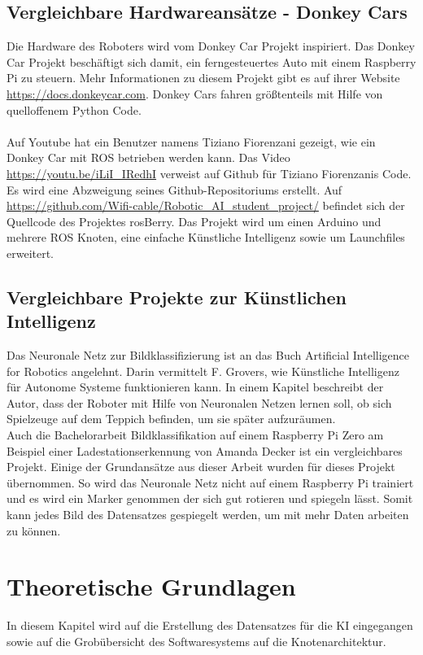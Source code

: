\documentclass[conference]{IEEEtran}
\begin{document}
	\subsection{Vergleichbare Hardwareansätze - Donkey Cars} %
	Die Hardware des Roboters wird vom Donkey Car Projekt inspiriert.
	Das Donkey Car Projekt beschäftigt sich damit, ein ferngesteuertes Auto mit einem Raspberry Pi zu steuern.
	Mehr Informationen zu diesem Projekt gibt es auf ihrer Website 
	\url{https://docs.donkeycar.com}.
	Donkey Cars fahren größtenteils mit Hilfe von quelloffenem Python Code. \\
	\\
	Auf Youtube hat ein Benutzer namens Tiziano Fiorenzani gezeigt, wie ein Donkey Car mit ROS betrieben werden kann.
	Das Video \url{https://youtu.be/iLiI\_IRedhI} verweist auf Github für 
	Tiziano 
	Fiorenzanis Code. Es wird eine Abzweigung seines Github-Repositoriums 
	erstellt. Auf 
	\url{https://github.com/Wifi-cable/Robotic_AI_student_project/}
	befindet sich der Quellcode des Projektes rosBerry. 
	Das Projekt wird um einen Arduino und mehrere ROS Knoten, eine 
	einfache Künstliche Intelligenz sowie um Launchfiles erweitert.
		
	\subsection{Vergleichbare Projekte zur Künstlichen Intelligenz} 
	Das Neuronale Netz zur Bildklassifizierung ist an das Buch \glqq Artificial Intelligence for Robotics\grqq  \cite{govers2018artificial} angelehnt.
	Darin vermittelt F. Grovers, wie Künstliche Intelligenz für Autonome 
	Systeme funktionieren kann.
	In einem Kapitel beschreibt der Autor, dass der Roboter mit Hilfe von Neuronalen Netzen lernen soll, ob sich Spielzeuge auf dem Teppich befinden, um sie später aufzuräumen.\\
	
	Auch die Bachelorarbeit \glqq Bildklassifikation auf einem Raspberry Pi 
	Zero am Beispiel einer Ladestationserkennung\grqq  \cite{Amanda} von 
	Amanda Decker ist ein vergleichbares Projekt.
	Einige der Grundansätze aus dieser Arbeit wurden für dieses Projekt übernommen.
	So wird das Neuronale Netz nicht auf einem Raspberry Pi trainiert und 
	es wird ein Marker genommen der sich gut rotieren und spiegeln lässt.
	Somit kann jedes Bild des Datensatzes gespiegelt werden, um mit mehr 
	Daten arbeiten zu können.
	
	\section{Theoretische Grundlagen}
	In diesem Kapitel wird auf die Erstellung des Datensatzes für die KI eingegangen sowie auf die Grobübersicht des Softwaresystems auf die Knotenarchitektur. %
	
\end{document}
